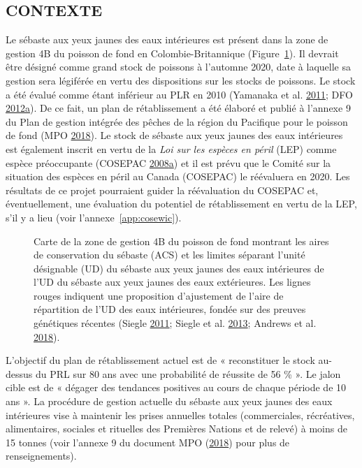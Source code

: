 \documentclass[french,11pt]{book}
\begin{document}
\hypertarget{sec:introduction-background}{%
\subsection{CONTEXTE}\label{sec:introduction-background}}

Le sébaste aux yeux jaunes des eaux intérieures est présent dans la zone de gestion 4B du poisson de fond en Colombie-Britannique (Figure~\ref{fig:map-4B}). Il devrait être désigné comme grand stock de poissons à l'automne 2020, date à laquelle sa gestion sera légiférée en vertu des dispositions sur les stocks de poissons. Le stock a été évalué comme étant inférieur au PLR en 2010 (Yamanaka et al. \protect\hyperlink{ref-yamanaka2011}{2011}; DFO \protect\hyperlink{ref-dfo2012}{2012}\protect\hyperlink{ref-dfo2012}{a}). De ce fait, un plan de rétablissement a été élaboré et publié à l'annexe 9 du Plan de gestion intégrée des pêches de la région du Pacifique pour le poisson de fond (MPO \protect\hyperlink{ref-ifmp2018}{2018}). Le stock de sébaste aux yeux jaunes des eaux intérieures est également inscrit en vertu de la \emph{Loi sur les espèces en péril} (LEP) comme espèce préoccupante (COSEPAC \protect\hyperlink{ref-cosewic2008}{2008}\protect\hyperlink{ref-cosewic2008}{a}) et il est prévu que le Comité sur la situation des espèces en péril au Canada (COSEPAC) le réévaluera en 2020. Les résultats de ce projet pourraient guider la réévaluation du COSEPAC et, éventuellement, une évaluation du potentiel de rétablissement en vertu de la LEP, s'il y a lieu (voir l'annexe~\ref{app:cosewic}).


\begin{figure}[htb]

{\centering {} 

}

\caption{Carte de la zone de gestion 4B du poisson de fond montrant les aires de conservation du sébaste (ACS) et les limites séparant l'unité désignable (UD) du sébaste aux yeux jaunes des eaux intérieures de l'UD du sébaste aux yeux jaunes des eaux extérieures. Les lignes rouges indiquent une proposition d'ajustement de l'aire de répartition de l'UD des eaux intérieures, fondée sur des preuves génétiques récentes (Siegle \protect\hyperlink{ref-siegle2011}{2011}; Siegle et al. \protect\hyperlink{ref-siegle2013}{2013}; Andrews et al. \protect\hyperlink{ref-andrews2018}{2018}).}\label{fig:map-4B}
\end{figure}
L'objectif du plan de rétablissement actuel est de « reconstituer le stock au-dessus du PRL sur 80 ans avec une probabilité de réussite de 56 \% ». Le jalon cible est de « dégager des tendances positives au cours de chaque période de 10 ans ». La procédure de gestion actuelle du sébaste aux yeux jaunes des eaux intérieures vise à maintenir les prises annuelles totales (commerciales, récréatives, alimentaires, sociales et rituelles des Premières Nations et de relevé) à moins de 15 tonnes (voir l'annexe 9 du document MPO (\protect\hyperlink{ref-ifmp2018}{2018}) pour plus de renseignements).
\end{document}
